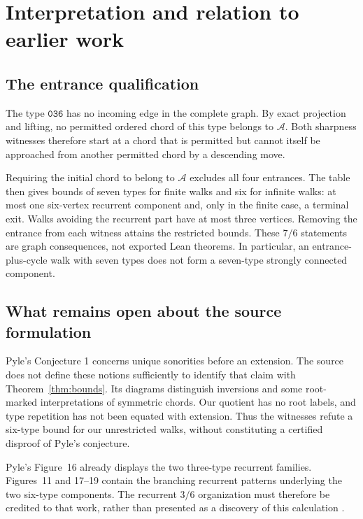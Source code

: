 \documentclass[11pt,letterpaper]{article}
\theoremstyle{definition}\newtheorem{definition}[theorem]{Definition}
\newcommand{\Aset}{\mathcal A}
\newcommand{\typ}[1]{\mathtt{#1}}
\begin{document}
\clearpage
\section{Interpretation and relation to earlier work}
\subsection{The entrance qualification}
The type $\typ{036}$ has no incoming edge in the complete graph. By exact projection and lifting, no permitted ordered chord of this type belongs to $\Aset$. Both sharpness witnesses therefore start at a chord that is permitted but cannot itself be approached from another permitted chord by a descending move.

Requiring the initial chord to belong to $\Aset$ excludes all four entrances. The table then gives bounds of seven types for finite walks and six for infinite walks: at most one six-vertex recurrent component and, only in the finite case, a terminal exit. Walks avoiding the recurrent part have at most three vertices. Removing the entrance from each witness attains the restricted bounds. These $7/6$ statements are graph consequences, not exported Lean theorems. In particular, an entrance-plus-cycle walk with seven types does not form a seven-type strongly connected component.

\subsection{What remains open about the source formulation}
Pyle's Conjecture 1 concerns unique sonorities before an extension. The source does not define these notions sufficiently to identify that claim with Theorem~\ref{thm:bounds}. Its diagrams distinguish inversions and some root-marked interpretations of symmetric chords. Our quotient has no root labels, and type repetition has not been equated with extension. Thus the witnesses refute a six-type bound for our unrestricted walks, without constituting a certified disproof of Pyle's conjecture.

Pyle's Figure~16 already displays the two three-type recurrent families. Figures~11 and 17--19 contain the branching recurrent patterns underlying the two six-type components. The recurrent $3/6$ organization must therefore be credited to that work, rather than presented as a discovery of this calculation \cite{pyle}.
\end{document}
